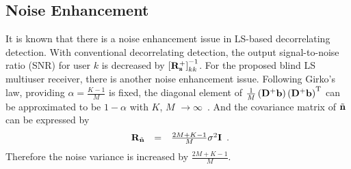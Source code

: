 \documentclass[a4paper,10pt,fleqn, twocolumn]{IEEETran}
\newcommand{\bb}{{\bf b}}
\newcommand{\bs}{{\bf s}}
\newcommand{\bn}{{\bf n}}
\newcommand{\bD}{{\bf D}}
\newcommand{\bI}{{\bf I}}
\newcommand{\bR}{{\bf R}}
\begin{document}
\subsection{Noise Enhancement} It is known that there is a noise
enhancement issue in LS-based decorrelating detection. With
conventional decorrelating detection, the output signal-to-noise
ratio (SNR) for user $k$ is decreased by
$\left[\bR_{\bs}^{+}\right]_{kk}^{-1}$. For the proposed blind LS
multiuser receiver, there is another noise enhancement issue.
Following Girko's law, providing $\alpha=\frac{K-1}{M}$ is fixed,
the diagonal element of
$\frac{1}{M}\left(\bD^{+}\bb\right)\left(\bD^{+}\bb\right)^{\rm
T}$ can be approximated to be $1-\alpha$ with $K$, $M$
$\rightarrow\infty$~\cite{Muller}. And the covariance matrix of
$\tilde\bn$ can be expressed by
\begin{equation}
\begin{array}{rcl}
\bR_{\tilde\bn}&=&\frac{2M+K-1}{M}\sigma^{2}\bI
\end{array}.\label{noise_var_new}
\end{equation}
\noindent Therefore the noise variance is increased by
$\frac{2M+K-1}{M}$.
\end{document}
